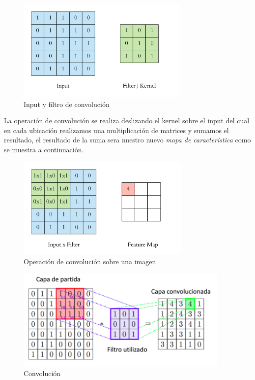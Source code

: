 \begin{figure}[H]
 \centering
  \includegraphics[height=5cm,keepaspectratio=true,clip=true]{imagenes/MarcoTeorico/convoluc_1.png}
  \caption{Input y filtro de convolución}\label{Fig:filter}
\end{figure}

La operación de convolución se realiza deslizando el kernel sobre el input del cual en cada ubicación realizamos una multiplicación de matrices y sumamos el resultado, el resultado de la suma sera nuestro nuevo \textit{mapa de característica} como se muestra a continuación.

\begin{figure}[H]
 \centering
  \includegraphics[height=5cm,keepaspectratio=true,clip=true]{imagenes/MarcoTeorico/convoluc_2.png}
  \caption{Operación de convolución sobre una imagen} 
\end{figure}


\begin{figure}[H]
 \centering
  \includegraphics[height=5cm,keepaspectratio=true,clip=true]{imagenes/MarcoTeorico/convolucion.png}
  \caption{Convolución} \label{Fig:convolucion}
\end{figure}

